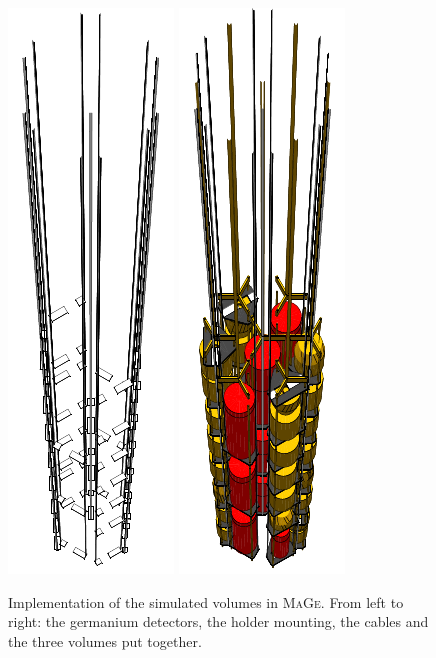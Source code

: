\begin{figure}
{		\includegraphics{img/cables.pdf}%
		\includegraphics{img/all.pdf}%
	}%
	\caption{Implementation of the simulated volumes in \textsc{MaGe}. From left to right: the germanium detectors, the holder mounting, the cables and the three volumes put together.}\label{fig:volumes}
\end{figure}

